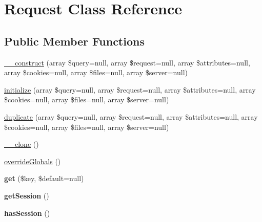 \hypertarget{class_symfony_1_1_component_1_1_http_foundation_1_1_request}{
\section{\-Request \-Class \-Reference}
\label{class_symfony_1_1_component_1_1_http_foundation_1_1_request}
}
\subsection*{\-Public \-Member \-Functions}
\begin{DoxyCompactItemize}
\item 
\hyperlink{class_symfony_1_1_component_1_1_http_foundation_1_1_request_a5c19fe962aebe6105ce2c2e8e7c528db}{\-\_\-\-\_\-construct} (array \$query=null, array \$request=null, array \$attributes=null, array \$cookies=null, array \$files=null, array \$server=null)
\item 
\hyperlink{class_symfony_1_1_component_1_1_http_foundation_1_1_request_a1e3614944f56dfdc26d1d8f65e77c562}{initialize} (array \$query=null, array \$request=null, array \$attributes=null, array \$cookies=null, array \$files=null, array \$server=null)
\item 
\hyperlink{class_symfony_1_1_component_1_1_http_foundation_1_1_request_ae57463c06084a1dbd45a0e96543f5b09}{duplicate} (array \$query=null, array \$request=null, array \$attributes=null, array \$cookies=null, array \$files=null, array \$server=null)
\item 
\hyperlink{class_symfony_1_1_component_1_1_http_foundation_1_1_request_ad0cb87b388bc74d63dc884accdca8713}{\-\_\-\-\_\-clone} ()
\item 
\hyperlink{class_symfony_1_1_component_1_1_http_foundation_1_1_request_ac948c6b4a68bb06b0e4f4249cf5f067e}{override\-Globals} ()
\item 
\hypertarget{class_symfony_1_1_component_1_1_http_foundation_1_1_request_a499d39d1876a05b20e1ca8e8a1c2b466}{
{\bfseries get} (\$key, \$default=null)}
\label{class_symfony_1_1_component_1_1_http_foundation_1_1_request_a499d39d1876a05b20e1ca8e8a1c2b466}

\item 
\hypertarget{class_symfony_1_1_component_1_1_http_foundation_1_1_request_aefa4c5bd150e2a7d525576d7959c6911}{
{\bfseries get\-Session} ()}
\label{class_symfony_1_1_component_1_1_http_foundation_1_1_request_aefa4c5bd150e2a7d525576d7959c6911}

\item 
\hypertarget{class_symfony_1_1_component_1_1_http_foundation_1_1_request_a6bc90d70bb501716783de7c8c29a97ad}{
{\bfseries has\-Session} ()}
\label{class_symfony_1_1_component_1_1_http_foundation_1_1_request_a6bc90d70bb501716783de7c8c29a97ad}


\end{DoxyCompactItemize}
